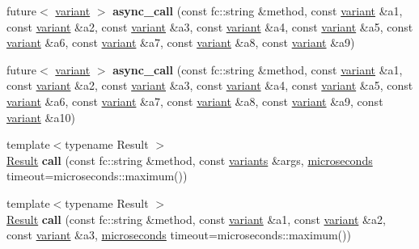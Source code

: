 \begin{Indent}
\begin{DoxyCompactItemize}
\item 
\mbox{\label{classfc_1_1rpc_1_1json__connection_a7b56af4096a96396e4cfe1214661a836}} 
future$<$ \mbox{\hyperlink{classfc_1_1variant}{variant}} $>$ {\bfseries async\+\_\+call} (const fc\+::string \&method, const \mbox{\hyperlink{classfc_1_1variant}{variant}} \&a1, const \mbox{\hyperlink{classfc_1_1variant}{variant}} \&a2, const \mbox{\hyperlink{classfc_1_1variant}{variant}} \&a3, const \mbox{\hyperlink{classfc_1_1variant}{variant}} \&a4, const \mbox{\hyperlink{classfc_1_1variant}{variant}} \&a5, const \mbox{\hyperlink{classfc_1_1variant}{variant}} \&a6, const \mbox{\hyperlink{classfc_1_1variant}{variant}} \&a7, const \mbox{\hyperlink{classfc_1_1variant}{variant}} \&a8, const \mbox{\hyperlink{classfc_1_1variant}{variant}} \&a9)
\item 
\mbox{\label{classfc_1_1rpc_1_1json__connection_abb956e9c9a118b19b0bdc13b1fc4189f}} 
future$<$ \mbox{\hyperlink{classfc_1_1variant}{variant}} $>$ {\bfseries async\+\_\+call} (const fc\+::string \&method, const \mbox{\hyperlink{classfc_1_1variant}{variant}} \&a1, const \mbox{\hyperlink{classfc_1_1variant}{variant}} \&a2, const \mbox{\hyperlink{classfc_1_1variant}{variant}} \&a3, const \mbox{\hyperlink{classfc_1_1variant}{variant}} \&a4, const \mbox{\hyperlink{classfc_1_1variant}{variant}} \&a5, const \mbox{\hyperlink{classfc_1_1variant}{variant}} \&a6, const \mbox{\hyperlink{classfc_1_1variant}{variant}} \&a7, const \mbox{\hyperlink{classfc_1_1variant}{variant}} \&a8, const \mbox{\hyperlink{classfc_1_1variant}{variant}} \&a9, const \mbox{\hyperlink{classfc_1_1variant}{variant}} \&a10)
\item 
\mbox{\label{classfc_1_1rpc_1_1json__connection_a0e134ef209e46edc578eb3b3997c962e}} 
{\footnotesize template$<$typename Result $>$ }\\\mbox{\hyperlink{struct_result}{Result}} {\bfseries call} (const fc\+::string \&method, const \mbox{\hyperlink{classstd_1_1vector}{variants}} \&args, \mbox{\hyperlink{classfc_1_1microseconds}{microseconds}} timeout=microseconds\+::maximum())
\item 
\mbox{\label{classfc_1_1rpc_1_1json__connection_af66e6444b056605ca65a22ef76d36c9a}} 
{\footnotesize template$<$typename Result $>$ }\\\mbox{\hyperlink{struct_result}{Result}} {\bfseries call} (const fc\+::string \&method, const \mbox{\hyperlink{classfc_1_1variant}{variant}} \&a1, const \mbox{\hyperlink{classfc_1_1variant}{variant}} \&a2, const \mbox{\hyperlink{classfc_1_1variant}{variant}} \&a3, \mbox{\hyperlink{classfc_1_1microseconds}{microseconds}} timeout=microseconds\+::maximum())

\end{DoxyCompactItemize}
\end{Indent}
